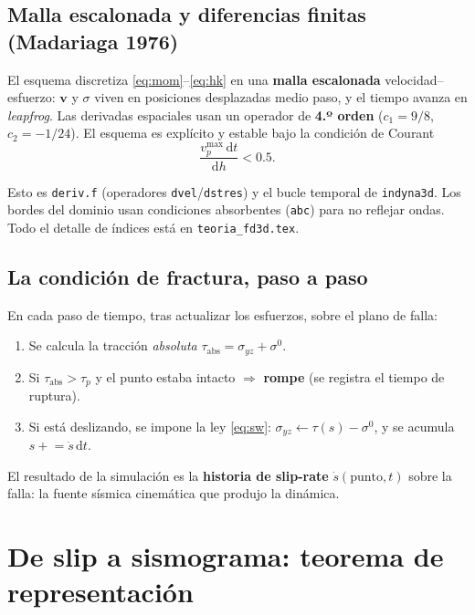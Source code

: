\documentclass[11pt,a4paper]{article}
\newcommand{\dd}{\mathrm{d}}
\newcommand{\vv}[1]{\mathbf{#1}}
\newcommand{\taup}{\tau_p}
\begin{document}
\subsection{Malla escalonada y diferencias finitas (Madariaga 1976)}
El esquema discretiza \eqref{eq:mom}--\eqref{eq:hk} en una \textbf{malla
escalonada} velocidad--esfuerzo: $\vv v$ y $\sigma$ viven en posiciones
desplazadas medio paso, y el tiempo avanza en \emph{leapfrog}. Las derivadas
espaciales usan un operador de \textbf{4.º orden} ($c_1=9/8$, $c_2=-1/24$). El
esquema es explícito y estable bajo la condición de Courant
\begin{equation}
  \frac{v_p^{\max}\,\dd t}{\dd h} < 0.5 .
\end{equation}

\begin{codebox}
Esto es \texttt{deriv.f} (operadores \texttt{dvel}/\texttt{dstres}) y el bucle
temporal de \texttt{indyna3d}. Los bordes del dominio usan condiciones
absorbentes (\texttt{abc}) para no reflejar ondas. Todo el detalle de índices
está en \texttt{teoria\_fd3d.tex}.
\end{codebox}

\subsection{La condición de fractura, paso a paso}
En cada paso de tiempo, tras actualizar los esfuerzos, sobre el plano de falla:
\begin{enumerate}
  \item Se calcula la tracción \emph{absoluta} $\tau_{\text{abs}}=\sigma_{yz}+\sigma^0$.
  \item Si $\tau_{\text{abs}}>\taup$ y el punto estaba intacto $\Rightarrow$
        \textbf{rompe} (se registra el tiempo de ruptura).
  \item Si está deslizando, se impone la ley \eqref{eq:sw}:
        $\sigma_{yz}\leftarrow \tau(s)-\sigma^0$, y se acumula
        $s\mathrel{+}=\dot s\,\dd t$.
\end{enumerate}
El resultado de la simulación es la \textbf{historia de slip-rate}
$\dot s(\text{punto},t)$ sobre la falla: la fuente sísmica cinemática que produjo
la dinámica.

\section{De slip a sismograma: teorema de representación}
\end{document}
